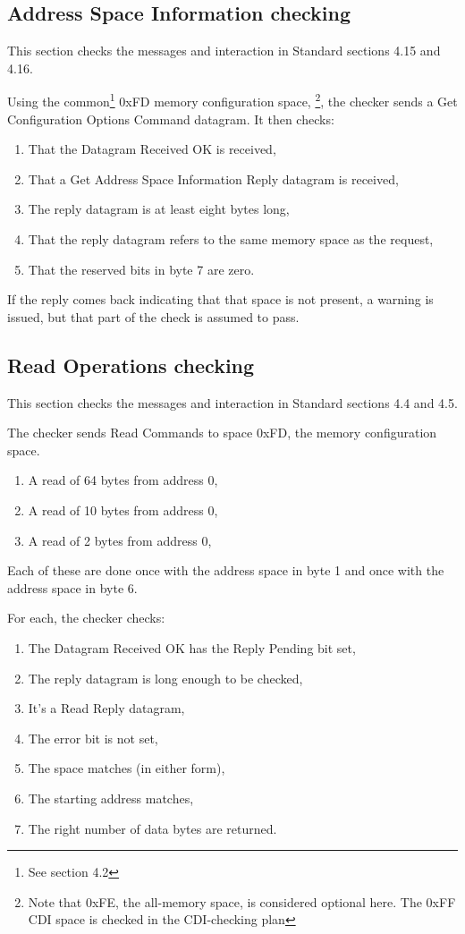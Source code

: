 \subsection{Address Space Information checking}

This section checks the messages and interaction in Standard sections 4.15 and 4.16.

Using the common\footnote{See section 4.2}
0xFD memory configuration space,
\footnote{Note that 0xFE, the all-memory space, is considered optional here. The 0xFF CDI 
space is checked in the CDI-checking plan}, 
the checker sends a Get Configuration Options Command datagram.  It then checks:
\begin{enumerate}
\item That the Datagram Received OK is received,
\item That a Get Address Space Information Reply datagram is received,
\item The reply datagram is at least eight bytes long,
\item That the reply datagram refers to the same memory space as the request,
\item That the reserved bits in byte 7 are zero.
\end{enumerate}

If the reply comes back indicating that that space is not present, 
a warning is issued, but that part of the check is assumed to pass.

\subsection{Read Operations checking}

This section checks the messages and interaction in Standard sections 4.4 and 4.5.

The checker sends Read Commands to space 0xFD, the memory configuration space.

\begin{enumerate}
\item A read of 64 bytes from address 0,
\item A read of 10 bytes from address 0,
\item A read of 2 bytes from address 0,
\end{enumerate}

Each of these are done once with the address space in byte 1 
and once with the address space in byte 6.

For each, the checker checks:
\begin{enumerate}
\item The Datagram Received OK has the Reply Pending bit set,
\item The reply datagram is long enough to be checked,
\item It's a Read Reply datagram,
\item The error bit is not set,
\item The space matches (in either form),
\item The starting address matches,
\item The right number of data bytes are returned.
\end{enumerate}

